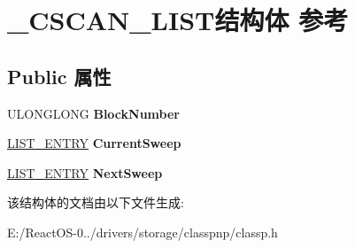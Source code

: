 \hypertarget{struct___c_s_c_a_n___l_i_s_t}{}\section{\+\_\+\+C\+S\+C\+A\+N\+\_\+\+L\+I\+S\+T结构体 参考}
\label{struct___c_s_c_a_n___l_i_s_t}
\subsection*{Public 属性}
\begin{DoxyCompactItemize}
\item 
\mbox{\label{struct___c_s_c_a_n___l_i_s_t_afa555b4824299df70cf77338482b5693}} 
U\+L\+O\+N\+G\+L\+O\+NG {\bfseries Block\+Number}
\item 
\mbox{\label{struct___c_s_c_a_n___l_i_s_t_a2464acb32667d5d307735bd68df11ce4}} 
\hyperlink{struct___l_i_s_t___e_n_t_r_y}{L\+I\+S\+T\+\_\+\+E\+N\+T\+RY} {\bfseries Current\+Sweep}
\item 
\mbox{\label{struct___c_s_c_a_n___l_i_s_t_a7f82130aec39c2ccaf83c80c23642428}} 
\hyperlink{struct___l_i_s_t___e_n_t_r_y}{L\+I\+S\+T\+\_\+\+E\+N\+T\+RY} {\bfseries Next\+Sweep}
\end{DoxyCompactItemize}


该结构体的文档由以下文件生成\+:\begin{DoxyCompactItemize}
\item 
E\+:/\+React\+O\+S-\/0../drivers/storage/classpnp/classp.\+h\end{DoxyCompactItemize}
